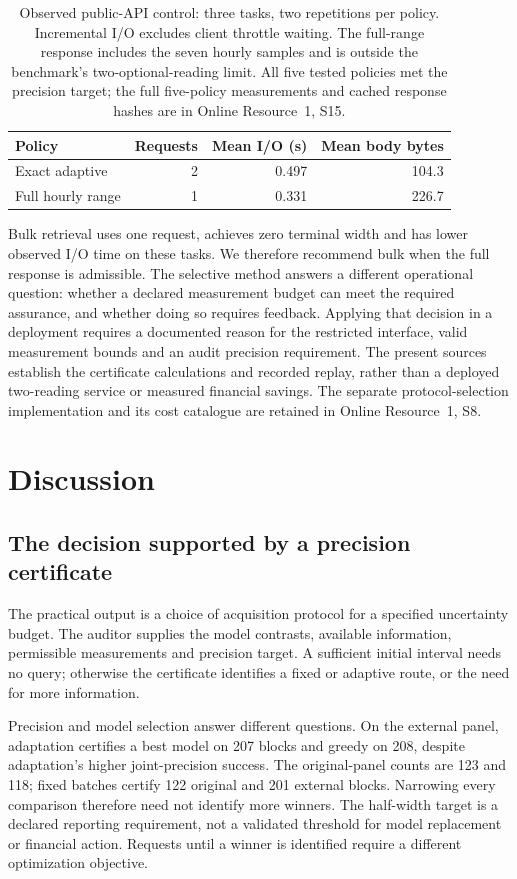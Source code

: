 \documentclass[12pt]{article}
\begin{document}
\begin{table}[htbp]\centering\small
\caption{Observed public-API control: three tasks, two repetitions per
policy. Incremental I/O excludes client throttle waiting. The full-range
response includes the seven hourly samples and is outside the benchmark's
two-optional-reading limit. All five tested policies met the precision
target; the full five-policy measurements and cached response hashes are
in Online Resource~1, S15.}\label{tab:actual-api}
\begin{tabular}{lrrr}\toprule
Policy & Requests & Mean I/O (s) & Mean body bytes\\\midrule
Exact adaptive & 2 & 0.497 & 104.3\\
Full hourly range & 1 & 0.331 & 226.7\\\bottomrule
\end{tabular}\end{table}

Bulk retrieval uses one request, achieves zero terminal width and has
lower observed I/O time on these tasks. We therefore recommend bulk when
the full response is admissible. The selective method answers a different
operational question: whether a declared measurement budget can meet the
required assurance, and whether doing so requires feedback. Applying that
decision in a deployment requires a documented reason for the restricted
interface, valid measurement bounds and an audit precision requirement.
The present sources establish the certificate calculations and recorded
replay, rather than a deployed two-reading service or measured financial
savings. The separate protocol-selection implementation and its cost
catalogue are retained in Online Resource~1, S8.
\section{Discussion}
\subsection{The decision supported by a precision certificate}
The practical output is a choice of acquisition protocol for a specified
uncertainty budget. The auditor supplies the model contrasts, available
information, permissible measurements and precision target. A sufficient
initial interval needs no query; otherwise the certificate identifies a
fixed or adaptive route, or the need for more information.

Precision and model selection answer different questions. On the external
panel, adaptation certifies a best model on 207 blocks and greedy on 208,
despite adaptation's higher joint-precision success. The original-panel
counts are 123 and 118; fixed batches certify 122 original and 201 external
blocks. Narrowing every comparison therefore need not identify more winners.
The half-width target is a declared reporting requirement, not a validated
threshold for model replacement or financial action. Requests until a winner
is identified require a different optimization objective.
\end{document}
